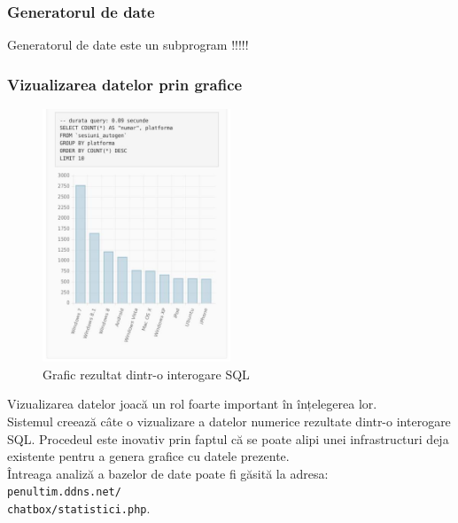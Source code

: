 \documentclass[12pt,a4paper]{article}
\begin{document}
\subsubsection{Generatorul de date}
Generatorul de date este un subprogram !!!!!
\subsubsection{Vizualizarea datelor prin grafice}

\begin{figure}
	\centering
	\vspace{-7px}
	\includegraphics[width=0.50\textwidth]{img/stat.jpg}
	\vspace{-7px}
	\caption{Grafic rezultat dintr-o interogare SQL}
\end{figure}

Vizualizarea datelor joacă un rol foarte important în înțelegerea lor. \\[0.34cm]

Sistemul creează câte o vizualizare a datelor numerice rezultate dintr-o interogare SQL. Procedeul este inovativ prin faptul că se poate alipi unei infrastructuri deja existente pentru a genera grafice cu datele prezente. \\[0.34cm]

Întreaga analiză a bazelor de date poate fi găsită la adresa: \\[0.5cm]
\texttt{penultim.ddns.net/\\chatbox/statistici.php}.


\newpage
\end{document}
